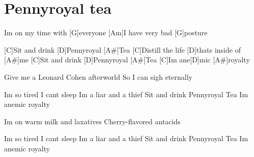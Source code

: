 \section{Pennyroyal tea}
\begin{multicols}{2}
\begin{guitar}
[Am]Im on my time with [G]everyone
[Am]I have very bad [G]posture


[C]Sit and drink [D]Pennyroyal [A#]Tea
[C]Distill the life [D]thats inside of [A#]me
[C]Sit and drink [D]Pennyroyal [A#]Tea
[C]Im ane[D]mic [A#]royalty


Give me a Leonard Cohen afterworld
So I can sigh eternally


Im so tired I cant sleep
Im a liar and a thief
Sit and drink Pennyroyal Tea
Im anemic royalty


Im on warm milk and laxatives
Cherry-flavored antacids


Im so tired I cant sleep
Im a liar and a thief
Sit and drink Pennyroyal Tea
Im anemic royalty
\end{guitar}
\end{multicols}
